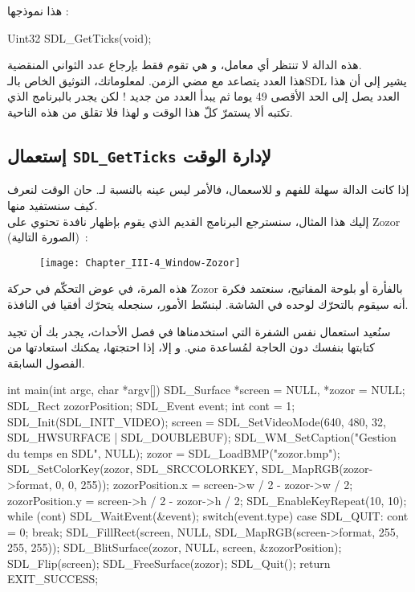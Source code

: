 هذا نموذجها :

\begin{Csource}
Uint32 SDL_GetTicks(void);
\end{Csource}

هذه الدالة لا تنتظر أي معامل، و هي تقوم فقط بإرجاع عدد الثواني المنقضية. \\
هذا العدد يتصاعد مع مضي الزمن. لمعلوماتك، التوثيق الخاص بالـ\textenglish{SDL}
يشير إلى أن هذا العدد يصل إلى الحد الأقصى 49 يوما ثم يبدأ العدد من جديد ! لكن يجدر بالبرنامج الذي تكتبه ألا يستمرّ كلّ هذا الوقت و لهذا فلا تقلق من هذه الناحية.

\subsection{إستعمال \texttt{SDL\_GetTicks} لإدارة الوقت}

إذا كانت الدالة
سهلة للفهم و للاسعمال، فالأمر ليس عينه بالنسبة لـ.
حان الوقت لنعرف كيف سنستفيد منها.\\
إليك هذا المثال، سنسترجع البرنامج القديم الذي يقوم بإظهار نافدة تحتوي على
\textenglish{Zozor}
(الصورة التالية)~:

\begin{figure}[H]
	\centering
	\texttt{[image: Chapter\_III-4\_Window-Zozor]}
\end{figure}

هذه المرة، في عوض التحكّم في حركة
\textenglish{Zozor}
بالفأرة أو بلوحة المفاتيح، سنعتمد فكرة أنه سيقوم بالتحرّك لوحده في الشاشة. لبنسّط الأمور، سنجعله يتحرّك أفقيا في النافذة. 

سنُعيد استعمال نفس الشفرة التي استخدمناها في فصل الأحداث، يجدر بك أن تجيد كتابتها بنفسك دون الحاجة لمُساعدة مني. و إلا،  إذا احتجتها، يمكنك استعادتها من الفصول السابقة.

\begin{Csource}
int main(int argc, char *argv[])
{
	SDL_Surface *screen = NULL, *zozor = NULL;
	SDL_Rect zozorPosition;
	SDL_Event event;
	int cont = 1;
	SDL_Init(SDL_INIT_VIDEO);
	screen = SDL_SetVideoMode(640, 480, 32, SDL_HWSURFACE | SDL_DOUBLEBUF);
	SDL_WM_SetCaption("Gestion du temps en SDL", NULL);
	zozor = SDL_LoadBMP("zozor.bmp");
	SDL_SetColorKey(zozor, SDL_SRCCOLORKEY, SDL_MapRGB(zozor->format, 0, 0, 255));
	zozorPosition.x = screen->w / 2 - zozor->w / 2;
	zozorPosition.y = screen->h / 2 - zozor->h / 2;
	SDL_EnableKeyRepeat(10, 10);
	while (cont)
	{
		SDL_WaitEvent(&event);
		switch(event.type)
		{
			case SDL_QUIT:
			cont = 0;
			break;
		}
		SDL_FillRect(screen, NULL, SDL_MapRGB(screen->format, 255, 255, 255));
		SDL_BlitSurface(zozor, NULL, screen, &zozorPosition);
		SDL_Flip(screen);
	}
	SDL_FreeSurface(zozor);
	SDL_Quit();
	return EXIT_SUCCESS;
}
\end{Csource}

